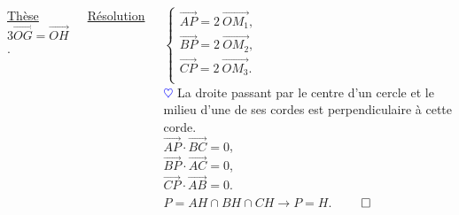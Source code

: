 \documentclass[10pt]{beamer}
\def \heart {\textcolor{blue}{$\heartsuit$} }
\newcommand{\vect}[1] {
  \overrightarrow{#1}}
\begin{document}
{\begin{columns}[t]
\begin{tcolorbox}[basic]
				    \underline{Thèse} \\
				    \smallskip
				    $3\vect{OG}=\vect{OH}$.
				    \end{tcolorbox}
		
		
		\centering
		
		\underline{Résolution}\\ \flushleft
		
		$\begin{cases}
		 \vect{AP}= 2\ \vect{OM_1}, \\
		 \vect{BP}= 2\ \vect{OM_2}, \\ 
		 \vect{CP}= 2\ \vect{OM_3}. \\
		\end{cases}$ \\ \bigskip
		\heart La droite passant par le centre d'un cercle et le milieu d'une de ses cordes est perpendiculaire à cette corde. \\ \bigskip
		$\vect{AP}\cdot\vect{BC}=0$, \\[0.5em]
	        $\vect{BP}\cdot\vect{AC}=0$, \\[0.5em] 
	        $\vect{CP}\cdot\vect{AB}=0$. \\ \bigskip
	        $P=AH\cap BH\cap CH \rightarrow P=H$. \hfill $\qed$
		
		
		
	
					
		
		\bigskip
		
		
	   \end{columns} 
    }
  
\end{document}
